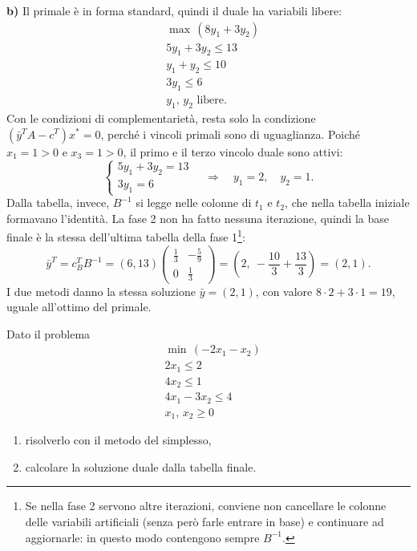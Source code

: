 \textbf{b)} Il primale è in forma standard, quindi il duale ha variabili libere:
\[
\begin{aligned}
&\max\, (8y_1 + 3y_2) \\
&5y_1 + 3y_2 \le 13 \\
&y_1 + y_2 \le 10 \\
&3y_1 \le 6 \\
&y_1,\, y_2 \text{ libere.}
\end{aligned}
\]
Con le condizioni di complementarietà, resta solo la condizione $(\bar{y}^T A - c^T)x^* = 0$, perché i vincoli primali sono di uguaglianza. Poiché $x_1 = 1 > 0$ e $x_3 = 1 > 0$, il primo e il terzo vincolo duale sono attivi:
\[
\begin{cases}
5y_1 + 3y_2 = 13 \\
3y_1 = 6
\end{cases}
\quad\Longrightarrow\quad y_1 = 2, \quad y_2 = 1.
\]
Dalla tabella, invece, $B^{-1}$ si legge nelle colonne di $t_1$ e $t_2$, che nella tabella iniziale formavano l'identità. La fase 2 non ha fatto nessuna iterazione, quindi la base finale è la stessa dell'ultima tabella della fase 1\footnote{Se nella fase 2 servono altre iterazioni, conviene non cancellare le colonne delle variabili artificiali (senza però farle entrare in base) e continuare ad aggiornarle: in questo modo contengono sempre $B^{-1}$.}:
\[
\bar{y}^T = c_B^T B^{-1} = (6, 13) \begin{pmatrix} \frac13 & -\frac59 \\ 0 & \frac13 \end{pmatrix} = \left(2,\ -\frac{10}{3} + \frac{13}{3}\right) = (2, 1).
\]
I due metodi danno la stessa soluzione $\bar{y} = (2, 1)$, con valore $8 \cdot 2 + 3 \cdot 1 = 19$, uguale all'ottimo del primale.

\begin{esercizio}
Dato il problema
\[
\begin{aligned}
&\min\, (-2x_1 - x_2) \\
&2x_1 \le 2 \\
&4x_2 \le 1 \\
&4x_1 - 3x_2 \le 4 \\
&x_1,\, x_2 \ge 0
\end{aligned}
\]
\begin{enumerate}[label=\alph*)]
    \item risolverlo con il metodo del simplesso,
    \item calcolare la soluzione duale dalla tabella finale.
\end{enumerate}
\end{esercizio}

